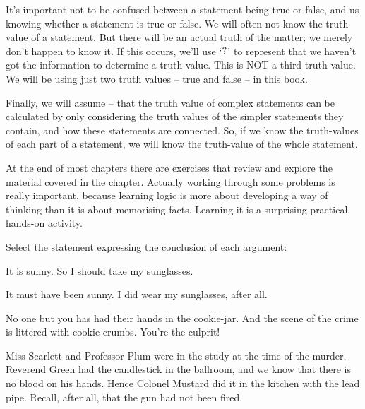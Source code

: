 \documentclass[PHIL101-Textbook.tex]{subfiles}
\begin{document}

It's important not to be confused between a statement being true or false, and us knowing whether a statement is true or false. We will often not know the truth value of a statement. But there will be an actual truth of the matter; we merely don't happen to know it. If this occurs, we'll use `$?$' to represent that we haven't got the information to determine a truth value. This is NOT a third truth value. We will be using just two truth values -- true and false -- in this book.


Finally, we will assume  -- that the truth value of complex statements can be calculated by only considering the truth values of the simpler statements they contain, and how these statements are connected. So, if we know the truth-values of each part of a statement, we will know the truth-value of the whole statement.


\pagebreak
\practiceproblems
At the end of most chapters there are exercises that review and explore the material covered in the chapter. Actually working through some problems is really important, because learning logic is more about developing a way of thinking than it is about memorising facts. Learning it is a surprising practical, hands-on activity.

\medskip

\noindent\solutions
\problempart \label{pr.Conclusions}

Select the statement expressing the conclusion of each argument:
\begin{earg}
	\item It is sunny. So I should take my sunglasses.
	\item It must have been sunny. I did wear my sunglasses, after all.
	\item No one but you has had their hands in the cookie-jar. And the scene of the crime is littered with cookie-crumbs. You're the culprit!
	\item Miss Scarlett and Professor Plum were in the study at the
	time of the murder. Reverend Green had the candlestick in the
	ballroom, and we know that there is no blood on his hands. Hence
	Colonel Mustard did it in the kitchen with the lead pipe.
	Recall, after all, that the gun had not been fired.
\end{earg}
\end{document}
